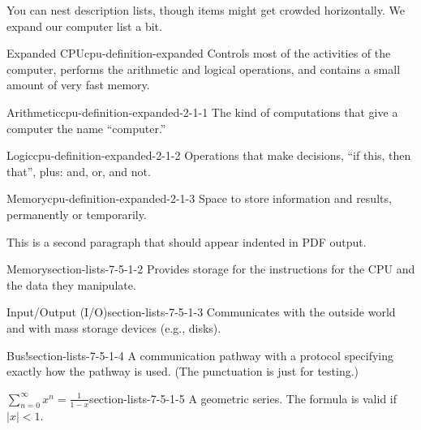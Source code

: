 \documentclass[pdflatex]{sn-jnl}
\theoremstyle{thmstyleone}%
\theoremstyle{thmstyletwo}%
\theoremstyle{thmstylethree}%
\numberwithin{equation}{section}
\begin{document}
%
\par
You can nest description lists, though items might get crowded horizontally.  We expand our computer list a bit.%
\begin{descriptionlist}
\begin{dlimedium}{Expanded CPU}{cpu-definition-expanded}%
Controls most of the activities of the computer, performs the arithmetic and logical operations, and contains a small amount of very fast memory.%
\begin{descriptionlist}
\begin{dlimedium}{Arithmetic}{cpu-definition-expanded-2-1-1}%
The kind of computations that give a computer the name ``computer.''%
\end{dlimedium}%
\begin{dlimedium}{Logic}{cpu-definition-expanded-2-1-2}%
Operations that make decisions, ``if this, then that'', plus: and, or, and not.%
\end{dlimedium}%
\begin{dlimedium}{Memory}{cpu-definition-expanded-2-1-3}%
Space to store information and results, permanently or temporarily.%
\end{dlimedium}%
\end{descriptionlist}
%
\par
This is a second paragraph that should appear indented in PDF output.%
\end{dlimedium}%
\begin{dlimedium}{Memory}{section-lists-7-5-1-2}%
Provides storage for the instructions for the CPU and the data they manipulate.%
\end{dlimedium}%
\begin{dlimedium}{Input\slash{}Output (I\slash{}O)}{section-lists-7-5-1-3}%
Communicates with the outside world and with mass storage devices (e.g.\@, disks).%
\end{dlimedium}%
\begin{dlimedium}{Bus!}{section-lists-7-5-1-4}%
A communication pathway with a protocol specifying exactly how the pathway is used. (The punctuation is just for testing.)%
\end{dlimedium}%
\begin{dlimedium}{\(\displaystyle \sum_{n=0}^\infty x^n = \frac{1}{1-x}\)}{section-lists-7-5-1-5}%
A geometric series.  The formula is valid if \(|x| < 1\).%
\end{dlimedium}%
\end{descriptionlist}
%
%
%
\typeout{************************************************}
\typeout{************************************************}
%
\end{document}

